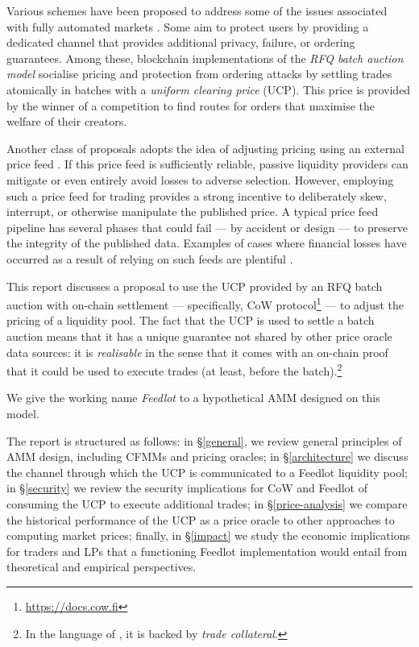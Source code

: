 \documentclass[a4paper,10pt]{article}
\theoremstyle{remark}
\begin{document}
Various schemes have been proposed to address some of the issues associated with fully automated markets \cite{ferreira2022credible, josojo2022mev, nikete2022towards, fleupold2022cow}.
%
Some aim to protect users by providing a dedicated channel that provides additional privacy, failure, or ordering guarantees.
%
Among these, blockchain implementations of the \emph{RFQ batch auction model} socialise pricing and protection from ordering attacks by settling trades atomically in batches with a \emph{uniform clearing price} (UCP).
%
This price is provided by the winner of a competition to find routes for orders that maximise the welfare of their creators.

Another class of proposals adopts the idea of adjusting pricing using an external price feed \cite{dodoex,synthetixlitepaper}.
%
If this price feed is sufficiently reliable, passive liquidity providers can mitigate or even entirely avoid losses to adverse selection.
%
However, employing such a price feed for trading provides a strong incentive to deliberately skew, interrupt, or otherwise manipulate the published price.
%
A typical price feed pipeline has several phases that could fail --- by accident or design --- to preserve the integrity of the published data. 
%
Examples of cases where financial losses have occurred as a result of relying on such feeds are plentiful \cite{liu2021first, cryptocat2020how, venus2022luna, eskandari2021sok}.

This report discusses a proposal to use the UCP provided by an RFQ batch auction with on-chain settlement --- specifically, CoW protocol\footnote{\url{https://docs.cow.fi}} --- to adjust the pricing of a liquidity pool.
%
The fact that the UCP is used to settle a batch auction means that it has a unique guarantee not shared by other price oracle data sources: it is \emph{realisable} in the sense that it comes with an on-chain proof that it could be used to execute trades (at least, before the batch).\footnote{In the language of \cite{suresh2022so}, it is backed by \emph{trade collateral}.}

We give the working name \emph{Feedlot} to a hypothetical AMM designed on this model.

The report is structured as follows: in \S\ref{general}, we review general principles of AMM design, including CFMMs and pricing oracles; 
%
in \S\ref{architecture} we discuss the channel through which the UCP is communicated to a Feedlot liquidity pool; 
%
in \S\ref{security} we review the security implications for CoW and Feedlot of consuming the UCP to execute additional trades;
%
in \S\ref{price-analysis} we compare the historical performance of the UCP as a price oracle to other approaches to computing market prices;
%
finally, in \S\ref{impact} we study the economic implications for traders and LPs that a functioning Feedlot implementation would entail from theoretical and empirical perspectives.
\end{document}
